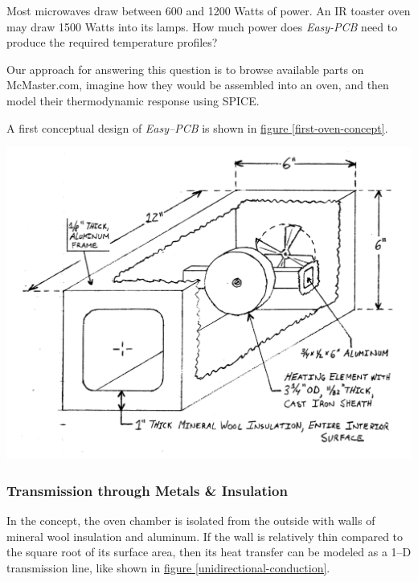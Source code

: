 \documentclass[10pt, twocolumn]{article}
\begin{document}
Most microwaves draw between 600 and 1200 Watts of power.
An IR toaster oven may draw 1500 Watts into its lamps.
How much power does \emph{Easy-PCB} need to produce the required temperature profiles?

Our approach for answering this question is to browse available parts on McMaster.com,
imagine how they would be assembled into an oven,
and then model their thermodynamic response using SPICE.

A first conceptual design of \emph{Easy--PCB} is shown in
\hyperref[first-oven-concept]{figure \ref{first-oven-concept}}.

\begin{center}
	\includegraphics[width=\columnwidth]{Figures/first-oven-concept.pdf}
	\label{first-oven-concept}
\end{center}

\subsubsection*{Transmission through Metals \& Insulation}

In the concept, the oven chamber is isolated from the outside with walls of
mineral wool insulation and aluminum.
If the wall is relatively thin compared to the square root of its surface area,
then its heat transfer can be modeled as a 1--D transmission line, like shown in
\hyperref[unidirectional-conduction]{figure \ref{unidirectional-conduction}}.
\end{document}
